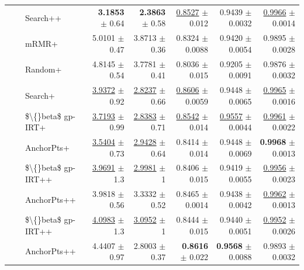 \begin{longtable}{llp{}rrrrr}
 &  & Search++ & \textbf{3.1853} {\scriptsize $\pm$ 0.64} & \textbf{2.3863} {\scriptsize $\pm$ 0.58} & \underline{0.8527} {\scriptsize $\pm$ 0.012} & 0.9439 {\scriptsize $\pm$ 0.0032} & \underline{0.9966} {\scriptsize $\pm$ 0.0014} \\
 &  & mRMR+ & 5.0101 {\scriptsize $\pm$ 0.47} & 3.8713 {\scriptsize $\pm$ 0.36} & 0.8324 {\scriptsize $\pm$ 0.0088} & 0.9420 {\scriptsize $\pm$ 0.0054} & 0.9895 {\scriptsize $\pm$ 0.0028} \\
 &  & Random+ & 4.8145 {\scriptsize $\pm$ 0.54} & 3.7781 {\scriptsize $\pm$ 0.41} & 0.8036 {\scriptsize $\pm$ 0.015} & 0.9205 {\scriptsize $\pm$ 0.0091} & 0.9876 {\scriptsize $\pm$ 0.0032} \\
 &  & Search+ & \underline{3.9372} {\scriptsize $\pm$ 0.92} & \underline{2.8237} {\scriptsize $\pm$ 0.66} & \underline{0.8606} {\scriptsize $\pm$ 0.0059} & 0.9448 {\scriptsize $\pm$ 0.0065} & \underline{0.9965} {\scriptsize $\pm$ 0.0016} \\
 &  & \$\textbackslash\{\}beta\$ gp-IRT+ & \underline{3.7193} {\scriptsize $\pm$ 0.99} & \underline{2.8383} {\scriptsize $\pm$ 0.71} & \underline{0.8542} {\scriptsize $\pm$ 0.014} & \underline{0.9557} {\scriptsize $\pm$ 0.0044} & \underline{0.9961} {\scriptsize $\pm$ 0.0022} \\
 &  & AnchorPts+ & \underline{3.5404} {\scriptsize $\pm$ 0.73} & \underline{2.9428} {\scriptsize $\pm$ 0.64} & 0.8414 {\scriptsize $\pm$ 0.014} & 0.9448 {\scriptsize $\pm$ 0.0069} & \textbf{0.9968} {\scriptsize $\pm$ 0.0013} \\
 &  & \$\textbackslash\{\}beta\$ gp-IRT++ & \underline{3.9691} {\scriptsize $\pm$ 1.3} & \underline{2.9981} {\scriptsize $\pm$ 1} & 0.8406 {\scriptsize $\pm$ 0.015} & 0.9419 {\scriptsize $\pm$ 0.0055} & \underline{0.9956} {\scriptsize $\pm$ 0.0023} \\
 &  & AnchorPts++ & 3.9818 {\scriptsize $\pm$ 0.56} & 3.3332 {\scriptsize $\pm$ 0.52} & 0.8465 {\scriptsize $\pm$ 0.0014} & 0.9438 {\scriptsize $\pm$ 0.0042} & \underline{0.9962} {\scriptsize $\pm$ 0.0013} \\
 &  & \$\textbackslash\{\}beta\$ gp-IRT++ & \underline{4.0983} {\scriptsize $\pm$ 1.3} & \underline{3.0952} {\scriptsize $\pm$ 1} & 0.8444 {\scriptsize $\pm$ 0.015} & 0.9440 {\scriptsize $\pm$ 0.0051} & \underline{0.9952} {\scriptsize $\pm$ 0.0026} \\
 &  & AnchorPts++ & 4.4407 {\scriptsize $\pm$ 0.97} & 2.8003 {\scriptsize $\pm$ 0.37} & \textbf{0.8616} {\scriptsize $\pm$ 0.022} & \textbf{0.9568} {\scriptsize $\pm$ 0.0088} & 0.9893 {\scriptsize $\pm$ 0.0032} \\

\end{longtable}
